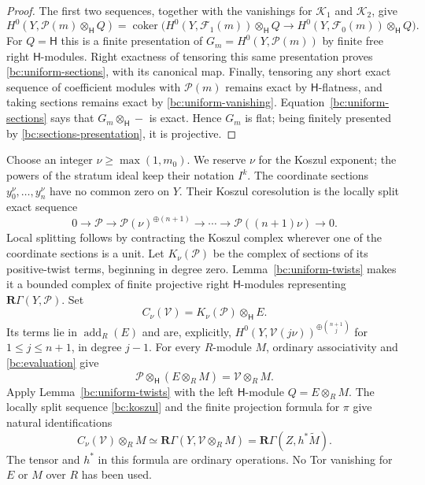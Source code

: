 \begin{proof}
The first two sequences, together with the vanishings for
$\mathcal K_1$ and $\mathcal K_2$, give
\begin{equation}\label{bc:sections-presentation}
 H^0(Y,\mathcal P(m)\otimes_{\mathsf H}Q)
 =\operatorname{coker}\bigl(
    H^0(Y,\mathcal F_1(m))\otimes_{\mathsf H}Q
       \longrightarrow
    H^0(Y,\mathcal F_0(m))\otimes_{\mathsf H}Q\bigr).
\end{equation}
For $Q=\mathsf H$ this is a finite presentation of
$G_m=H^0(Y,\mathcal P(m))$ by finite free right $\mathsf H$-modules.
Right exactness of tensoring this same presentation proves
\eqref{bc:uniform-sections}, with its canonical map.
Finally, tensoring any short exact sequence of coefficient modules
with $\mathcal P(m)$ remains exact by $\mathsf H$-flatness, and taking
sections remains exact by \eqref{bc:uniform-vanishing}.
Equation~\eqref{bc:uniform-sections} says that $G_m\otimes_{\mathsf H}-$
is exact.  Hence $G_m$ is flat; being finitely presented by
\eqref{bc:sections-presentation}, it is projective.
\end{proof}

Choose an integer $\nu\ge\max(1,m_0)$.  We reserve $\nu$ for the Koszul
exponent; the powers of the stratum ideal keep their notation $I^k$.
The coordinate sections $y_0^\nu,\ldots,y_n^\nu$ have no common zero
on $Y$.  Their Koszul
coresolution is the locally split exact sequence
\begin{equation}\label{bc:koszul}
 0\longrightarrow\mathcal P\longrightarrow
 \mathcal P(\nu)^{\oplus(n+1)}\longrightarrow\cdots\longrightarrow
 \mathcal P((n+1)\nu)\longrightarrow0.
\end{equation}
Local splitting follows by contracting the Koszul complex wherever one
of the coordinate sections is a unit.  Let $K_\nu(\mathcal P)$ be the
complex of sections of its positive-twist terms, beginning in degree
zero.  Lemma~\ref{bc:uniform-twists} makes it a bounded complex of finite
projective right $\mathsf H$-modules representing
$\mathbf R\Gamma(Y,\mathcal P)$.  Set
\[
 C_\nu(\mathcal V)=K_\nu(\mathcal P)\otimes_{\mathsf H}E.
\]
Its terms lie in $\operatorname{add}_R(E)$ and are, explicitly,
$H^0(Y,\mathcal V(j\nu))^{\oplus\binom{n+1}{j}}$ for
$1\le j\le n+1$, in degree $j-1$.
For every $R$-module $M$, ordinary associativity and
\eqref{bc:evaluation} give
\[
 \mathcal P\otimes_{\mathsf H}(E\otimes_RM)
          =\mathcal V\otimes_RM.
\]
Apply Lemma~\ref{bc:uniform-twists} with the left $\mathsf H$-module
$Q=E\otimes_RM$.  The locally split sequence \eqref{bc:koszul} and the
finite projection formula for $\pi$ give natural identifications
\begin{equation}\label{bc:ordinary-complex}
 C_\nu(\mathcal V)\otimes_R M
      \simeq\mathbf R\Gamma(Y,\mathcal V\otimes_RM)
      =\mathbf R\Gamma(Z,h^*\widetilde M).
\end{equation}
The tensor and $h^*$ in this formula are ordinary operations.  No Tor
vanishing for $E$ or $M$ over $R$ has been used.

